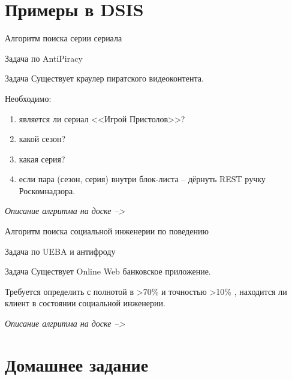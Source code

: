 \section{Примеры в DSIS}\label{section:examples_2_dsis}

\begin{frame}{Алгоритм поиска серии сериала}
	
	Задача по AntiPiracy
	
	\begin{block}{Задача}
		Существует краулер пиратского видеоконтента.
		
		Необходимо:
		\begin{enumerate}
			\item является ли сериал <<Игрой Пристолов>>?
			\item какой сезон?
			\item какая серия?
			\item если пара (сезон, серия) внутри блок-листа -- дёрнуть REST ручку Роскомнадзора.
		\end{enumerate}
	\end{block}
	
	\textit{Описание алгритма на доске --> }
	
	
\end{frame}


\begin{frame}{Алгоритм поиска социальной инженерии по поведению}
	
	Задача по UEBA и антифроду
	
	\begin{block}{Задача}
		Существует Online Web банковское приложение.
		
		Требуется определить с полнотой в >70\% и точностью >10\% , находится ли клиент в состоянии социальной инженерии.
	
	\end{block}
	
	\textit{Описание алгритма на доске --> }
	
	
\end{frame}


\section{Домашнее задание}

